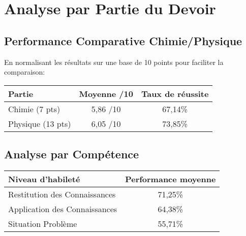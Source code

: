 \documentclass[12pt]{article}
\begin{document}
\begin{center}
\end{center}

\section{Analyse par Partie du Devoir}

\subsection{Performance Comparative Chimie/Physique}
En normalisant les résultats sur une base de 10 points pour faciliter la comparaison:

\begin{center}
\begin{tabular}{|l|c|c|}
\hline
\textbf{Partie} & \textbf{Moyenne /10} & \textbf{Taux de réussite} \\
\hline
Chimie (7 pts) & 5,86 /10 & 67,14\% \\
Physique (13 pts) & 6,05 /10 & 73,85\% \\
\hline
\end{tabular}
\end{center}

\begin{center}
\end{center}

\subsection{Analyse par Compétence}

\begin{center}
\begin{tabular}{|l|c|}
\hline
\textbf{Niveau d'habileté} & \textbf{Performance moyenne} \\
\hline
Restitution des Connaissances & 71,25\% \\
Application des Connaissances & 64,38\% \\
Situation Problème & 55,71\% \\
\hline
\end{tabular}
\end{center}
\end{document}
